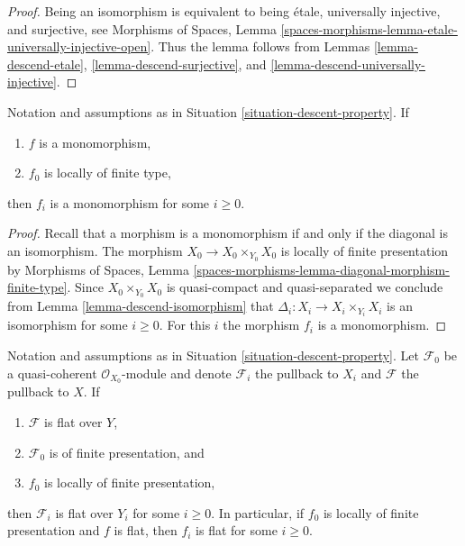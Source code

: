\begin{proof}
Being an isomorphism is equivalent to being \'etale, universally injective,
and surjective, see
Morphisms of Spaces, Lemma
\ref{spaces-morphisms-lemma-etale-universally-injective-open}.
Thus the lemma follows from
Lemmas \ref{lemma-descend-etale},
\ref{lemma-descend-surjective}, and
\ref{lemma-descend-universally-injective}.
\end{proof}

\begin{lemma}
\label{lemma-descend-monomorphism}
Notation and assumptions as in Situation \ref{situation-descent-property}. If
\begin{enumerate}
\item $f$ is a monomorphism,
\item $f_0$ is locally of finite type,
\end{enumerate}
then $f_i$ is a monomorphism for some $i \geq 0$.
\end{lemma}

\begin{proof}
Recall that a morphism is a monomorphism if and only if the diagonal is
an isomorphism. The morphism $X_0 \to X_0 \times_{Y_0} X_0$ is locally of
finite presentation by
Morphisms of Spaces, Lemma
\ref{spaces-morphisms-lemma-diagonal-morphism-finite-type}.
Since $X_0 \times_{Y_0} X_0$ is quasi-compact and quasi-separated
we conclude from
Lemma \ref{lemma-descend-isomorphism}
that $\Delta_i : X_i \to X_i \times_{Y_i} X_i$ is an isomorphism for
some $i \geq 0$. For this $i$ the morphism $f_i$ is a monomorphism.
\end{proof}

\begin{lemma}
\label{lemma-descend-flat}
Notation and assumptions as in Situation \ref{situation-descent-property}.
Let $\mathcal{F}_0$ be a quasi-coherent $\mathcal{O}_{X_0}$-module
and denote $\mathcal{F}_i$ the pullback to $X_i$ and $\mathcal{F}$
the pullback to $X$. If
\begin{enumerate}
\item $\mathcal{F}$ is flat over $Y$,
\item $\mathcal{F}_0$ is of finite presentation, and
\item $f_0$ is locally of finite presentation,
\end{enumerate}
then $\mathcal{F}_i$ is flat over $Y_i$ for some $i \geq 0$.
In particular, if $f_0$ is locally of finite presentation and
$f$ is flat, then $f_i$ is flat for some $i \geq 0$.
\end{lemma}

